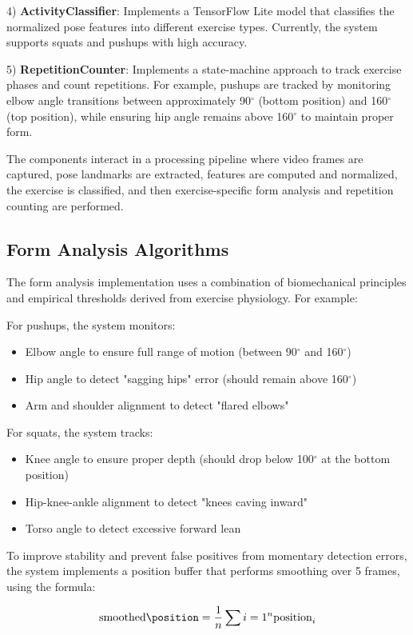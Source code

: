 \documentclass[11pt]{article}
\begin{document}
4) \textbf{ActivityClassifier}: Implements a TensorFlow Lite model that classifies the normalized pose features into different exercise types. Currently, the system supports squats and pushups with high accuracy.

5) \textbf{RepetitionCounter}: Implements a state-machine approach to track exercise phases and count repetitions. For example, pushups are tracked by monitoring elbow angle transitions between approximately 90$^\circ$ (bottom position) and 160$^\circ$ (top position), while ensuring hip angle remains above 160$^\circ$ to maintain proper form.

The components interact in a processing pipeline where video frames are captured, pose landmarks are extracted, features are computed and normalized, the exercise is classified, and then exercise-specific form analysis and repetition counting are performed.

\subsection{Form Analysis Algorithms}
The form analysis implementation uses a combination of biomechanical principles and empirical thresholds derived from exercise physiology. For example:

For pushups, the system monitors:
\begin{itemize}
\item Elbow angle to ensure full range of motion (between 90$^\circ$ and 160$^\circ$)
\item Hip angle to detect "sagging hips" error (should remain above 160$^\circ$)
\item Arm and shoulder alignment to detect "flared elbows"
\end{itemize}

For squats, the system tracks:
\begin{itemize}
\item Knee angle to ensure proper depth (should drop below 100$^\circ$ at the bottom position)
\item Hip-knee-ankle alignment to detect "knees caving inward"
\item Torso angle to detect excessive forward lean
\end{itemize}

To improve stability and prevent false positives from momentary detection errors, the system implements a position buffer that performs smoothing over 5 frames, using the formula:

\begin{equation}
\text{smoothed\position} = \frac{1}{n} \sum{i=1}^{n} \text{position}_i
\end{equation}
\end{document}
